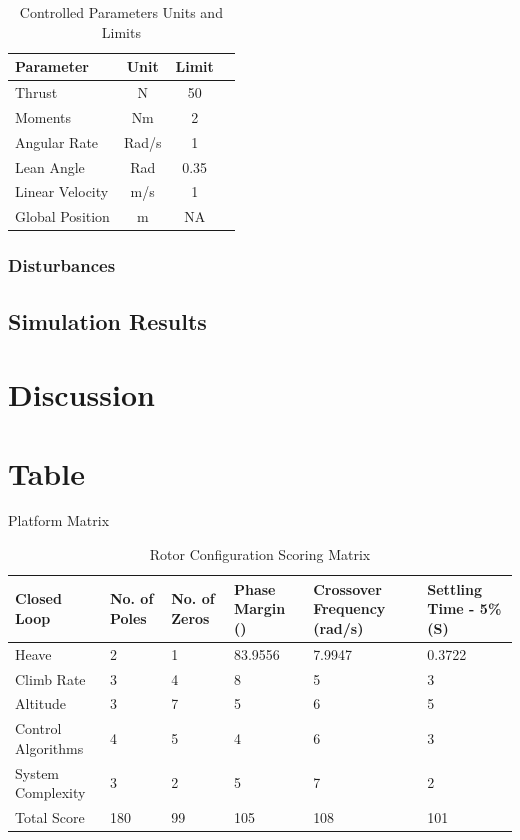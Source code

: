 		\begin{table}[!]
			\centering
			\begin{tabular}{l | c | c | c |}
				Parameter & Unit & Limit\\
				\hline\hline
				Thrust					& N 	& 50\\
				Moments					& Nm 	& 2\\
				Angular Rate 	   		& Rad/s & 1\\
				Lean Angle	    		& Rad 	& 0.35\\ %
				Linear Velocity 	  	& m/s 	& 1\\
				Global Position  		& m 	& NA\\
			\end{tabular}
			\label{tab:UnitsLimits}
			\caption{Controlled Parameters Units and Limits}
		\end{table}
		
		\subsubsection{Disturbances}
		
		
		\subsection{Simulation Results}
			
			\section{Discussion}
			
			\section{Table}
			Platform Matrix
			\begin{table}[!]
				\centering
				\begin{tabular}{l | l | l | l | p{2cm} | p{2cm} |}
					Closed Loop & No. of Poles & No. of Zeros & Phase Margin (\textdegree) & Crossover Frequency (rad/s) & Settling Time - 5\% (S)\\
					\hline\hline
					Heave 	   				& 2 & 1 & 83.9556 & 7.9947 & 0.3722\\
					Climb Rate 			    & 3 & 4 & 8 & 5 & 3\\
					Altitude		 	  	& 3 & 7 & 5 & 6 & 5\\
					Control Algorithms  	& 4 & 5 & 4 & 6 & 3\\
					System Complexity 		& 3 & 2 & 5 & 7 & 2\\
					\hline\hline
					Total Score 			& 180 & 99 & 105 & 108 & 101\\
				\end{tabular}
				\label{tab:PlatformDesign}
				\caption{Rotor Configuration Scoring Matrix}
			\end{table}
		